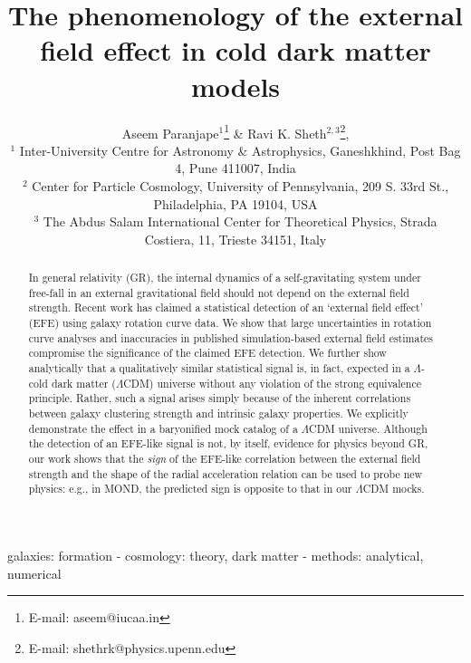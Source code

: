 \documentclass[usenatbib]{mnras}
\title[EFE in CDM]{The phenomenology of the external field effect in cold dark matter models}
\author[Paranjape \& Sheth]{
 Aseem Paranjape$^{1}$\thanks{E-mail: aseem@iucaa.in} \& 
 Ravi K. Sheth$^{2,3}$\thanks{E-mail: shethrk@physics.upenn.edu},
\\  
 $^1$ Inter-University Centre for Astronomy \& Astrophysics, Ganeshkhind, Post Bag 4, Pune 411007, India\\
 $^2$ Center for Particle Cosmology, University of Pennsylvania, 209 S. 33rd St., Philadelphia, PA 19104, USA\\
 $^3$ The Abdus Salam International Center for Theoretical Physics, Strada Costiera, 11, Trieste 34151, Italy      }
\begin{document}
\label{firstpage}
\pagerange{\pageref{firstpage}--\pageref{lastpage}}
\maketitle

\begin{abstract}
In general relativity (GR), the internal dynamics of a self-gravitating system under free-fall in an external gravitational field should not depend on the external field strength.  %
Recent work has claimed a statistical detection of an `external field effect' (EFE) using galaxy rotation curve data.  %
We show that large uncertainties in rotation curve analyses and inaccuracies in published simulation-based external field estimates compromise the significance of the claimed EFE detection. %
We further show analytically that a qualitatively similar statistical signal is, in fact, expected in a $\Lambda$-cold dark matter ($\Lambda$CDM) universe without any violation of the strong equivalence principle. %
Rather, such a signal arises simply because of the inherent correlations between galaxy clustering strength and intrinsic galaxy properties. %
We explicitly demonstrate the effect in a baryonified mock catalog of a $\Lambda$CDM universe.  %
Although the detection of an EFE-like signal is not, by itself, evidence for physics beyond GR, our work shows that the \emph{sign} of the EFE-like correlation between the external field strength and the shape of the radial acceleration relation
can be used to probe new physics:  e.g., in MOND, the predicted sign is opposite to that in our $\Lambda$CDM mocks. %
\end{abstract}

\begin{keywords}
galaxies: formation - cosmology: theory, dark matter - methods: analytical, numerical
\end{keywords} 
\end{document}
